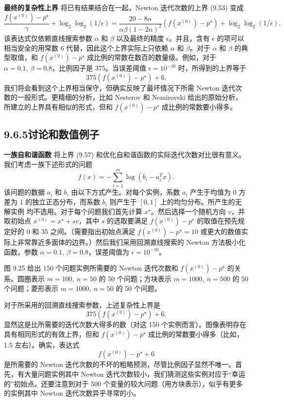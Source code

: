 \documentclass[UTF8,12pt,a4paper,fontset=fandol]{ctexart}
\begin{document}
\noindent\textbf{最终的复杂性上界}\quad
将已有结果结合在一起，Newton 迭代次数的上界 (9.53) 变成
\begin{equation}
\frac{f(x^{(0)})-p^\star}{\gamma}+\log_2\log_2(1/\epsilon)
=\frac{20-8\alpha}{\alpha\beta(1-2\alpha)^2}(f(x^{(0)})-p^\star)
+\log_2\log_2(1/\epsilon).
\tag{9.56}
\end{equation}
该表达式仅依赖直线搜索参数 $\alpha$ 和 $\beta$ 以及最终的精度 $\epsilon$。并且，含有 $\epsilon$ 的项可以相当安全的用常数 6 代替，因此这个上界实际上只依赖 $\alpha$ 和 $\beta$。对于 $\alpha$ 和 $\beta$ 的典型取值，和 $f(x^{(0)})-p^\star$ 成比例的常数在数百的数量级。例如，对于 $\alpha=0.1,\ \beta=0.8$，比例因子是 375。当误差阈值 $\epsilon=10^{-10}$ 时，所得到的上界等于
\begin{equation}
375(f(x^{(0)})-p^\star)+6.
\tag{9.57}
\end{equation}
我们将会看到这个上界相当保守，但确实反映了最坏情况下所需 Newton 迭代次数的一般形式。更精细的分析，比如 Nesterov 和 Nemirovski 给出的原始分析，所建立的上界具有相似的形式，但和 $f(x^{(0)})-p^\star$ 成比例的常数要小得多。

\subsection*{9.6.5\quad 讨论和数值例子}

\noindent\textbf{一族自和谐函数}\quad
将上界 (9.57) 和优化自和谐函数的实际迭代次数对比很有意义。我们考虑一族下述形式的问题
\[
f(x)=-\sum_{i=1}^m\log(b_i-a_i^Tx).
\]
该问题的数据 $a_i$ 和 $b_i$ 由以下方式产生。对每个实例，系数 $a_i$ 产生于均值为 0 方差为 1 的独立正态分布，而系数 $b_i$ 则产生于 $[0,1]$ 上的均匀分布。所产生的无解实例
均不选用。对于每个问题我们首先计算 $x^\star$。然后选择一个随机方向 $v$，并取初始点 $x^{(0)}=x^\star+sv$，其中 $s$ 的选取要满足 $f(x^{(0)})-p^\star$ 的取值在预先规定好的 0 和 35 之间。（需要指出初始点满足 $f(x^{(0)})-p^\star=10$ 或更大的数值实际上非常靠近多面体的边界。）然后我们采用回溯直线搜索的 Newton 方法极小化函数，参数 $\alpha=0.1,\ \beta=0.8$，误差阈值为 $\epsilon=10^{-10}$。

图 9.25 给出 150 个问题实例所需要的 Newton 迭代次数和 $f(x^{(0)})-p^\star$ 的关系。圆圈表示 $m=100,\ n=50$ 的 50 个问题；方块表示 $m=1000,\ n=500$ 的 50 个问题；菱形表示 $m=1000,\ n=50$ 的 50 个问题。

对于所采用的回溯直线搜索参数，上述复杂性上界是
\begin{equation}
375(f(x^{(0)})-p^\star)+6.
\tag{9.58}
\end{equation}
显然这是比所需要的迭代次数大得多的数（对这 150 个实例而言）。图像表明存在具有相同形式的有效上界，但和 $f(x^{(0)})-p^\star$ 成比例的常数要小得多（比如，1.5 左右）。确实，表达式
\[
f(x^{(0)})-p^\star+6
\]
是所需要的 Newton 迭代次数的不坏的粗略预测，尽管比例因子显然不唯一。首先，有大量问题实例其中 Newton 迭代次数较小，我们猜测这些实例对应于“幸运的”初始点。还要注意到对于 500 个变量的较大问题（用方块表示），似乎有更多的实例其中 Newton 迭代次数异乎寻常的小。
\end{document}
